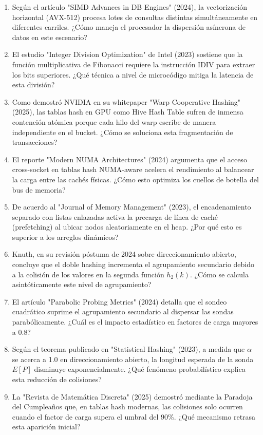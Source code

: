 \documentclass[12pt,a4paper]{report}
\begin{document}
\begin{enumerate}
    \item Según el artículo "SIMD Advances in DB Engines" (2024), la vectorización horizontal (AVX-512) procesa lotes de consultas distintas simultáneamente en diferentes carriles. ¿Cómo maneja el procesador la dispersión asíncrona de datos en este escenario?
    \item El estudio "Integer Division Optimization" de Intel (2023) sostiene que la función multiplicativa de Fibonacci requiere la instrucción IDIV para extraer los bits superiores. ¿Qué técnica a nivel de microcódigo mitiga la latencia de esta división?
    \item Como demostró NVIDIA en su whitepaper "Warp Cooperative Hashing" (2025), las tablas hash en GPU como Hive Hash Table sufren de inmensa contención atómica porque cada hilo del warp escribe de manera independiente en el bucket. ¿Cómo se soluciona esta fragmentación de transacciones?
    \item El reporte "Modern NUMA Architectures" (2024) argumenta que el acceso cross-socket en tablas hash NUMA-aware acelera el rendimiento al balancear la carga entre las cachés físicas. ¿Cómo esto optimiza los cuellos de botella del bus de memoria?
    \item De acuerdo al "Journal of Memory Management" (2023), el encadenamiento separado con listas enlazadas activa la precarga de línea de caché (prefetching) al ubicar nodos aleatoriamente en el heap. ¿Por qué esto es superior a los arreglos dinámicos?
    \item Knuth, en su revisión póstuma de 2024 sobre direccionamiento abierto, concluye que el doble hashing incrementa el agrupamiento secundario debido a la colisión de los valores en la segunda función $h_2(k)$. ¿Cómo se calcula asintóticamente este nivel de agrupamiento?
    \item El artículo "Parabolic Probing Metrics" (2024) detalla que el sondeo cuadrático suprime el agrupamiento secundario al dispersar las sondas parabólicamente. ¿Cuál es el impacto estadístico en factores de carga mayores a 0.8?
    \item Según el teorema publicado en "Statistical Hashing" (2023), a medida que $\alpha$ se acerca a 1.0 en direccionamiento abierto, la longitud esperada de la sonda $E[P]$ disminuye exponencialmente. ¿Qué fenómeno probabilístico explica esta reducción de colisiones?
    \item La "Revista de Matemática Discreta" (2025) demostró mediante la Paradoja del Cumpleaños que, en tablas hash modernas, las colisiones solo ocurren cuando el factor de carga supera el umbral del 90\%. ¿Qué mecanismo retrasa esta aparición inicial?

\end{enumerate}
\end{document}
